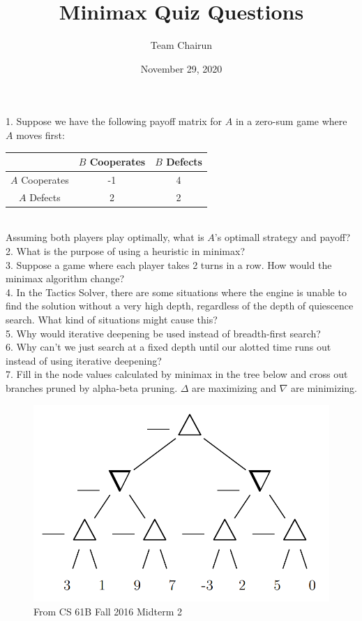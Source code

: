 \documentclass[12pt, letterpaper]{article}
\title{Minimax Quiz Questions}
\author{Team Chairun}
\date{November 29, 2020}
\begin{document}
\maketitle

1. Suppose we have the following payoff matrix for $A$ in a zero-sum game where $A$ moves first: \\
\begin{tabular}{|c|c|c|}
    \hline
    & $B$ Cooperates & $B$ Defects \\
    \hline
    $A$ Cooperates & -1 & 4 \\
    \hline
    $A$ Defects & 2 & 2 \\
    \hline
\end{tabular} \\
Assuming both players play optimally, what is $A$'s optimall strategy and payoff? \\

2. What is the purpose of using a heuristic in minimax? \\

3. Suppose a game where each player takes 2 turns in a row. How would the minimax algorithm change? \\

4. In the Tactics Solver, there are some situations where the engine is unable to find the solution without a very high depth, regardless of the depth of quiescence search. What kind of situations might cause this? \\

5. Why would iterative deepening be used instead of breadth-first search? \\

6. Why can't we just search at a fixed depth until our alotted time runs out instead of using iterative deepening? \\

7. Fill in the node values calculated by minimax in the tree below and cross out branches pruned by alpha-beta pruning. $\Delta$ are maximizing and $\nabla$ are minimizing.
\begin{figure}[H]
    \centering
    \includegraphics[scale=0.3]{minimax-prob.png}
    \caption*{From CS 61B Fall 2016 Midterm 2}
\end{figure}
\end{document}
